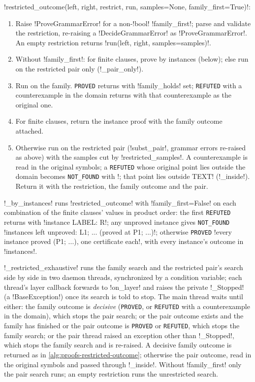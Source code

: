 \begin{algorithm}\label{alg:proofs-restricted-outcome}
\py!restricted_outcome(left, right, restrict, run, samples=None, family_first=True)!:
\begin{enumerate}
\item Raise \py!ProveGrammarError! for a non-\py!bool! \py!family_first!; parse and validate the restriction, re-raising a \py!DecideGrammarError! as \py!ProveGrammarError!. An empty restriction returns \py!run(left, right, samples=samples)!.
\item Without \py!family_first!: for finite clauses, prove by instances (below); else run on the restricted pair only (\py!_pair_only!).
\item Run on the family. \texttt{PROVED} returns with \py!family_holds! set; \texttt{REFUTED} with a counterexample in the domain returns with that counterexample as the original one.
\item For finite clauses, return the instance proof with the family outcome attached.
\item Otherwise run on the restricted pair (\py!subst_pair!, grammar errors re-raised as above) with the samples cut by \py!restricted_samples!. A counterexample is read in the original symbols; a \texttt{REFUTED} whose original point lies outside the domain becomes \texttt{NOT\_FOUND} with \code!; that point lies outside TEXT! (\py!_inside!). Return it with the restriction, the family outcome and the pair.
\end{enumerate}
\py!_by_instances! runs \py!restricted_outcome! with \py!family_first=False! on each combination of the finite clauses' values in product order: the first \texttt{REFUTED} returns with \code!instance LABEL: R!; any unproved instance gives \texttt{NOT\_FOUND} \code!instances left unproved: L1; ... (proved at P1; ...)!; otherwise \texttt{PROVED} \code!every instance proved (P1; ...), one certificate each!, with every instance's outcome in \py!instances!.
\end{algorithm}

\begin{algorithm}\label{alg:proofs-restricted-exhaustive}
\py!_restricted_exhaustive! runs the family search and the restricted pair's search side by side in two daemon threads, synchronized by a condition variable; each thread's layer callback forwards to \py!on_layer! and raises the private \py!_Stopped! (a \py!BaseException!) once its search is told to stop. The main thread waits until either: the family outcome is \emph{decisive} (\texttt{PROVED}, or \texttt{REFUTED} with a counterexample in the domain), which stops the pair search; or the pair outcome exists and the family has finished or the pair outcome is \texttt{PROVED} or \texttt{REFUTED}, which stops the family search; or the pair thread raised an exception other than \py!_Stopped!, which stops the family search and is re-raised. A decisive family outcome is returned as in \cref{alg:proofs-restricted-outcome}; otherwise the pair outcome, read in the original symbols and passed through \py!_inside!. Without \py!family_first! only the pair search runs; an empty restriction runs the unrestricted search.
\end{algorithm}

